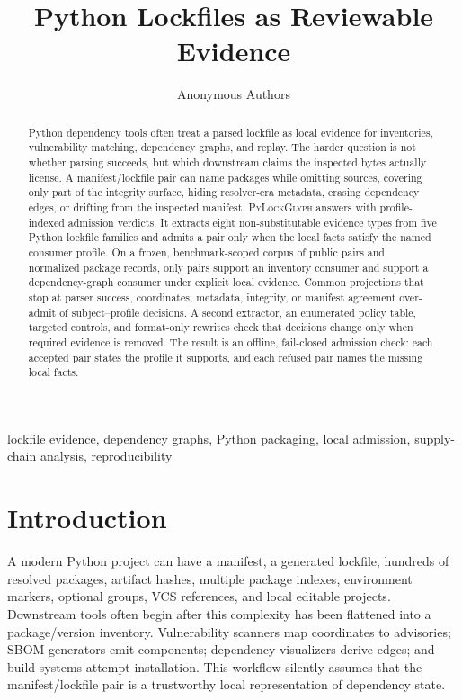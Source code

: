 \documentclass[10pt,conference]{IEEEtran}
\newcommand{\tool}{\textsc{PyLockGlyph}}
\begin{document}
\title{Python Lockfiles as Reviewable Evidence}
\author{Anonymous Authors}
\maketitle

\begin{abstract}
Python dependency tools often treat a parsed lockfile as local evidence for inventories, vulnerability matching, dependency graphs, and replay. The harder question is not whether parsing succeeds, but which downstream claims the inspected bytes actually license. A manifest/lockfile pair can name packages while omitting sources, covering only part of the integrity surface, hiding resolver-era metadata, erasing dependency edges, or drifting from the inspected manifest. \tool{} answers with profile-indexed admission verdicts. It extracts eight non-substitutable evidence types from five Python lockfile families and admits a pair only when the local facts satisfy the named consumer profile. On a frozen, benchmark-scoped corpus of \SubjectCount{} public pairs and \PackageCount{} normalized package records, only \InventoryEligible{} pairs support an inventory consumer and \GraphEligible{} support a dependency-graph consumer under explicit local evidence. Common projections that stop at parser success, coordinates, metadata, integrity, or manifest agreement over-admit \ProjectionOver{} of \ProjectionDecisions{} subject--profile decisions. A second extractor, an enumerated policy table, \ControlledCases{} targeted controls, and format-only rewrites check that decisions change only when required evidence is removed. The result is an offline, fail-closed admission check: each accepted pair states the profile it supports, and each refused pair names the missing local facts.
\end{abstract}

\begin{IEEEkeywords}
lockfile evidence, dependency graphs, Python packaging, local admission, supply-chain analysis, reproducibility
\end{IEEEkeywords}

\section{Introduction}
A modern Python project can have a manifest, a generated lockfile, hundreds of resolved packages, artifact hashes, multiple package indexes, environment markers, optional groups, VCS references, and local editable projects. Downstream tools often begin after this complexity has been flattened into a package/version inventory. Vulnerability scanners map coordinates to advisories; SBOM generators emit components; dependency visualizers derive edges; and build systems attempt installation. This workflow silently assumes that the manifest/lockfile pair is a trustworthy local representation of dependency state.
\end{document}
